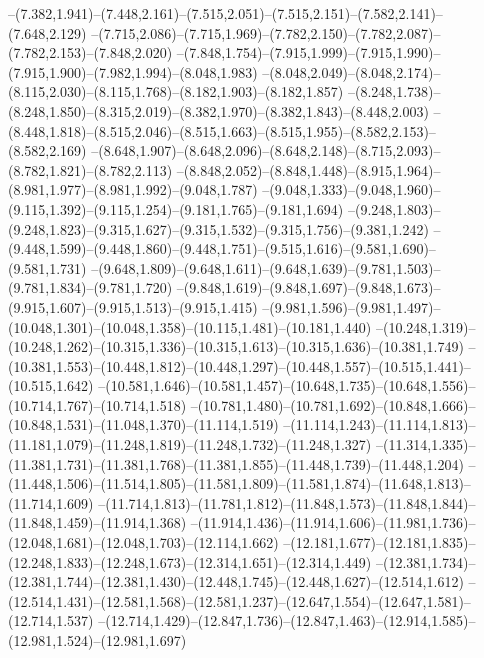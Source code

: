  --(7.382,1.941)--(7.448,2.161)--(7.515,2.051)--(7.515,2.151)--(7.582,2.141)--(7.648,2.129)%
  --(7.715,2.086)--(7.715,1.969)--(7.782,2.150)--(7.782,2.087)--(7.782,2.153)--(7.848,2.020)%
  --(7.848,1.754)--(7.915,1.999)--(7.915,1.990)--(7.915,1.900)--(7.982,1.994)--(8.048,1.983)%
  --(8.048,2.049)--(8.048,2.174)--(8.115,2.030)--(8.115,1.768)--(8.182,1.903)--(8.182,1.857)%
  --(8.248,1.738)--(8.248,1.850)--(8.315,2.019)--(8.382,1.970)--(8.382,1.843)--(8.448,2.003)%
  --(8.448,1.818)--(8.515,2.046)--(8.515,1.663)--(8.515,1.955)--(8.582,2.153)--(8.582,2.169)%
  --(8.648,1.907)--(8.648,2.096)--(8.648,2.148)--(8.715,2.093)--(8.782,1.821)--(8.782,2.113)%
  --(8.848,2.052)--(8.848,1.448)--(8.915,1.964)--(8.981,1.977)--(8.981,1.992)--(9.048,1.787)%
  --(9.048,1.333)--(9.048,1.960)--(9.115,1.392)--(9.115,1.254)--(9.181,1.765)--(9.181,1.694)%
  --(9.248,1.803)--(9.248,1.823)--(9.315,1.627)--(9.315,1.532)--(9.315,1.756)--(9.381,1.242)%
  --(9.448,1.599)--(9.448,1.860)--(9.448,1.751)--(9.515,1.616)--(9.581,1.690)--(9.581,1.731)%
  --(9.648,1.809)--(9.648,1.611)--(9.648,1.639)--(9.781,1.503)--(9.781,1.834)--(9.781,1.720)%
  --(9.848,1.619)--(9.848,1.697)--(9.848,1.673)--(9.915,1.607)--(9.915,1.513)--(9.915,1.415)%
  --(9.981,1.596)--(9.981,1.497)--(10.048,1.301)--(10.048,1.358)--(10.115,1.481)--(10.181,1.440)%
  --(10.248,1.319)--(10.248,1.262)--(10.315,1.336)--(10.315,1.613)--(10.315,1.636)--(10.381,1.749)%
  --(10.381,1.553)--(10.448,1.812)--(10.448,1.297)--(10.448,1.557)--(10.515,1.441)--(10.515,1.642)%
  --(10.581,1.646)--(10.581,1.457)--(10.648,1.735)--(10.648,1.556)--(10.714,1.767)--(10.714,1.518)%
  --(10.781,1.480)--(10.781,1.692)--(10.848,1.666)--(10.848,1.531)--(11.048,1.370)--(11.114,1.519)%
  --(11.114,1.243)--(11.114,1.813)--(11.181,1.079)--(11.248,1.819)--(11.248,1.732)--(11.248,1.327)%
  --(11.314,1.335)--(11.381,1.731)--(11.381,1.768)--(11.381,1.855)--(11.448,1.739)--(11.448,1.204)%
  --(11.448,1.506)--(11.514,1.805)--(11.581,1.809)--(11.581,1.874)--(11.648,1.813)--(11.714,1.609)%
  --(11.714,1.813)--(11.781,1.812)--(11.848,1.573)--(11.848,1.844)--(11.848,1.459)--(11.914,1.368)%
  --(11.914,1.436)--(11.914,1.606)--(11.981,1.736)--(12.048,1.681)--(12.048,1.703)--(12.114,1.662)%
  --(12.181,1.677)--(12.181,1.835)--(12.248,1.833)--(12.248,1.673)--(12.314,1.651)--(12.314,1.449)%
  --(12.381,1.734)--(12.381,1.744)--(12.381,1.430)--(12.448,1.745)--(12.448,1.627)--(12.514,1.612)%
  --(12.514,1.431)--(12.581,1.568)--(12.581,1.237)--(12.647,1.554)--(12.647,1.581)--(12.714,1.537)%
  --(12.714,1.429)--(12.847,1.736)--(12.847,1.463)--(12.914,1.585)--(12.981,1.524)--(12.981,1.697)%
